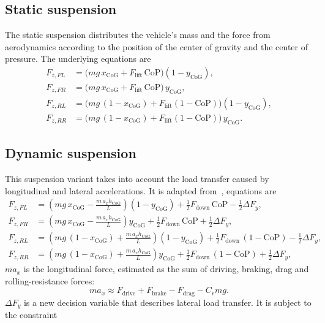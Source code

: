 \subsection{Static suspension}
\label{staticsusp}
The static suspension distributes the vehicle's mass and the force from aerodynamics according to the position of the center of gravity and the center of pressure. The underlying equations are
\begin{equation}
    \begin{aligned}
        F_{z,FL} &= \bigl(m g\, x_\text{CoG} + F_\text{lift}\,\text{CoP}\bigr)(1 - y_\text{CoG}) ,\\
        F_{z,FR} &= \bigl(m g\, x_\text{CoG} + F_\text{lift}\,\text{CoP}\bigr)\, y_\text{CoG}    , \\
        F_{z,RL} &= \bigl(m g\,(1-x_\text{CoG}) + F_\text{lift}(1-\text{CoP})\bigr)(1 - y_\text{CoG}) ,\\
        F_{z,RR} &= \bigl(m g\,(1-x_\text{CoG}) + F_\text{lift}(1-\text{CoP})\bigr)\, y_\text{CoG}.
    \end{aligned}
\end{equation}
\subsection{Dynamic suspension}
This suspension variant takes into account the load transfer caused by longitudinal and lateral accelerations. It is adapted from~\cite{2026ClassProject}, equations are
\begin{equation}
    \begin{aligned}
        F_{z,FL} &= \!\left(m g\, x_\text{CoG} - \frac{m\, a_x h_\text{CoG}}{L}\right)\!(1-y_\text{CoG})
                  + \tfrac{1}{2} F_\text{down}\,\text{CoP} - \tfrac{1}{2}\Delta F_y ,\\[3pt]
        F_{z,FR} &= \!\left(m g\, x_\text{CoG} - \frac{m\, a_x h_\text{CoG}}{L}\right)\! y_\text{CoG}
                  + \tfrac{1}{2} F_\text{down}\,\text{CoP} + \tfrac{1}{2}\Delta F_y ,\\[3pt]
        F_{z,RL} &= \!\left(m g\,(1-x_\text{CoG}) + \frac{m\, a_x h_\text{CoG}}{L}\right)\!(1-y_\text{CoG})
                  + \tfrac{1}{2} F_\text{down}\,(1-\text{CoP}) - \tfrac{1}{2}\Delta F_y ,\\[3pt]
        F_{z,RR} &= \!\left(m g\,(1-x_\text{CoG}) + \frac{m\, a_x h_\text{CoG}}{L}\right)\! y_\text{CoG}
                  + \tfrac{1}{2} F_\text{down}\,(1-\text{CoP}) + \tfrac{1}{2}\Delta F_y,
    \end{aligned}
\end{equation}
$m a_x$ is the longitudinal force, estimated as the sum of driving, braking, drag and rolling-resistance forces:
\begin{equation}
m a_x \approx F_\text{drive} + F_\text{brake} - F_\text{drag} - C_r m g.
\end{equation}
$\Delta F_y$ is a new decision variable that describes lateral load transfer. It is subject to the constraint

